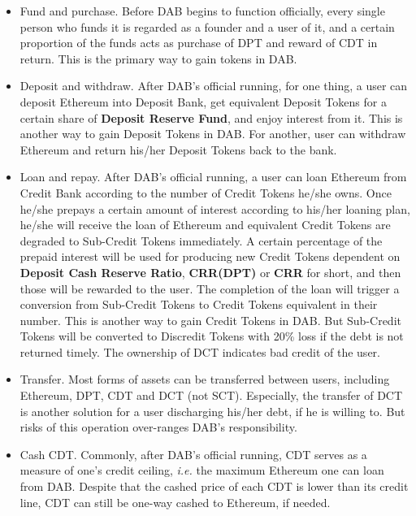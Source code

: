 \documentclass[review]{elsarticle}
\begin{document}
\begin{itemize}
   \item Fund and purchase. Before DAB begins to function officially, every single person who funds it is regarded as a founder and a user of it, and a certain proportion of the funds acts as purchase of DPT and reward of CDT in return. This is the primary way to gain tokens in DAB.
   \item Deposit and withdraw. After DAB's official running, for one thing, a user can deposit Ethereum into Deposit Bank, get equivalent Deposit Tokens for a certain share of \textbf{Deposit Reserve Fund}, and enjoy interest from it. This is another way to gain Deposit Tokens in DAB. For another, user can withdraw Ethereum and return his/her Deposit Tokens back to the bank.
   \item Loan and repay. After DAB's official running, a user can loan Ethereum from Credit Bank according to the number of Credit Tokens he/she owns. Once he/she prepays a certain amount of interest according to his/her loaning plan, he/she will receive the loan of Ethereum and equivalent Credit Tokens are degraded to Sub-Credit Tokens immediately. A certain percentage of the prepaid interest will be used for producing new Credit Tokens dependent on \textbf{Deposit Cash Reserve Ratio}, \textbf{CRR(DPT)} or \textbf{CRR} for short, and then those will be rewarded to the user. The completion of the loan will trigger a conversion from Sub-Credit Tokens to Credit Tokens equivalent in their number. This is another way to gain Credit Tokens in DAB. But Sub-Credit Tokens will be converted to Discredit Tokens with 20\% loss if the debt is not returned timely. The ownership of DCT indicates bad credit of the user.
   \item Transfer. Most forms of assets can be transferred between users, including Ethereum, DPT, CDT and DCT (not SCT). Especially, the transfer of DCT is another solution for a user discharging his/her debt, if he is willing to. But risks of this operation over-ranges DAB's responsibility.
   \item Cash CDT. Commonly, after DAB's official running, CDT serves as a measure of one's credit ceiling, \emph{i.e.} the maximum Ethereum one can loan from DAB. Despite that the cashed price of each CDT is lower than its credit line, CDT can still be one-way cashed to Ethereum, if needed.
\end{itemize}
\end{document}
